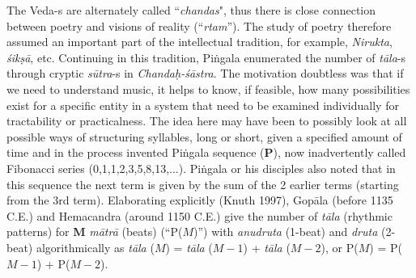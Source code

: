 The Veda-s are alternately called “\textsl{chandas}", thus there is close connection between poetry and visions of reality (“\textsl{rtam}”). The study of poetry therefore assumed an important part of the intellectual tradition, for example, \textsl{Nirukta}, \textsl{śikṣā}, etc. Continuing in this tradition, Piṅgala enumerated the number of \textsl{tāla}-s through cryptic \textsl{sūtra}-s in \textsl{Chandaḥ-śāstra}. The motivation doubtless was that if we need to understand music, it helps to know, if feasible, how many possibilities exist for a specific entity in a system that need to be examined individually for tractability or practicalness. The idea here may have been to possibly look at all possible ways of structuring syllables, long or short, given a specified amount of time and in the process invented Piṅgala sequence (\textbf{P}), now inadvertently called Fibonacci series (0,1,1,2,3,5,8,13,...). Piṅgala
 or his disciples also noted that in this sequence the next term is given by the sum of the 2 earlier terms (starting from the 3rd term). Elaborating explicitly (Knuth 1997), Gopāla (before 1135 C.E.) and Hemacandra (around 1150 C.E.) give the number of \textsl{tāla} (rhythmic patterns) for \textbf{M} \textsl{mātrā} (beats) (“P($M$)”) with \textsl{anudruta} (1-beat) and \textsl{druta} (2-beat) algorithmically as \textsl{tāla} ($M$) = \textsl{tāla} ($M-1$) + \textsl{tāla} ($M-2$), or P($M$) = P($M-1$) + P($M-2$).

